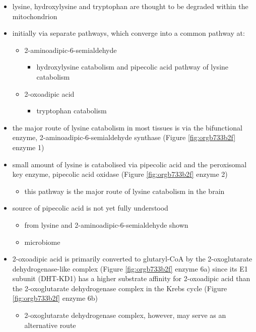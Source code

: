 \documentclass{scrartcl}
\begin{document}
\begin{itemize}
\item lysine, hydroxylysine and tryptophan are thought to be degraded
within the mitochondrion
\item initially via separate pathways, which converge into a common 
pathway at:
\begin{itemize}
\item 2-aminoadipic-6-semialdehyde
\begin{itemize}
\item hydroxylysine catabolism and pipecolic acid pathway of lysine
catabolism
\end{itemize}
\item 2-oxoadipic acid
\begin{itemize}
\item tryptophan catabolism
\end{itemize}
\end{itemize}
\item the major route of lysine catabolism in most tissues is via the
bifunctional enzyme, 2-aminoadipic-6-semialdehyde synthase (Figure \ref{fig:orgb733b2f} enzyme 1)
\item small amount of lysine is catabolised via pipecolic acid and the
peroxisomal key enzyme, pipecolic acid oxidase (Figure \ref{fig:orgb733b2f} enzyme 2)
\begin{itemize}
\item this pathway is the major route of lysine catabolism in the
brain
\end{itemize}
\item source of pipecolic acid is not yet fully understood
\begin{itemize}
\item from lysine and 2-aminoadipic-6-semialdehyde shown
\item microbiome
\end{itemize}

\item 2-oxoadipic acid is primarily converted to glutaryl-CoA by the
2-oxoglutarate dehydrogenase-like complex (Figure \ref{fig:orgb733b2f} enzyme 6a)
since its E1 subunit (DHT-KD1) has a higher substrate affinity for
2-oxoadipic acid than the 2-oxoglutarate dehydrogenase complex in
the Krebs cycle (Figure \ref{fig:orgb733b2f} enzyme 6b)

\begin{itemize}
\item 2-oxoglutarate dehydrogenase complex, however, may serve as an
alternative route


\end{itemize}
\end{itemize}
\end{document}
